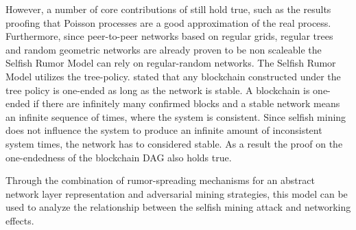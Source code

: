 However, a number of core contributions of \gopalan still hold true, such as the results proofing that Poisson processes are a good approximation of the real process. Furthermore, since peer-to-peer networks based on regular grids, regular trees and random geometric networks are already proven to be non scaleable the Selfish Rumor Model can rely on regular-random networks. The Selfish Rumor Model utilizes the tree-policy. \gopalan stated that any blockchain constructed under the tree policy is one-ended as long as the network is stable. A blockchain is one-ended if there are infinitely many confirmed blocks and a stable network means an infinite sequence of times, where the system is consistent. Since selfish mining does not influence the system to produce an infinite amount of inconsistent system times, the network has to considered stable. As a result the proof on the one-endedness of the blockchain DAG also holds true.

Through the combination of rumor-spreading mechanisms for an abstract network layer representation and adversarial mining strategies, this model can be used to analyze the relationship between the selfish mining attack and networking effects.




